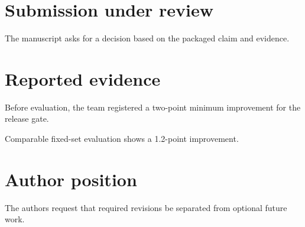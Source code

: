 \documentclass{article}
\begin{document}
\section{Submission under review}
The manuscript asks for a decision based on the packaged claim and evidence.
\section{Reported evidence}
Before evaluation, the team registered a two-point minimum improvement for the release gate.

Comparable fixed-set evaluation shows a 1.2-point improvement.
\section{Author position}
The authors request that required revisions be separated from optional future work.
\end{document}
